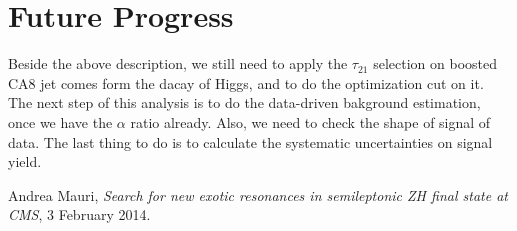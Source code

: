\documentclass[12pt]{article} %
\begin{document}
\section{Future Progress} %

Beside the above description, we still need to apply the $\tau_{21}$ selection on boosted CA8 jet comes form the dacay of Higgs, and to do the optimization cut on it. The next step of this analysis is to do the data-driven bakground estimation, once we have the $\alpha$ ratio already. Also, we need to check the shape of signal of data. The last thing to do is to calculate the systematic uncertainties on signal yield.



\begin{thebibliography}{9} %

 Andrea Mauri, \emph{Search for new exotic resonances in semileptonic ZH final state at CMS}, 3 February 2014.

\end{thebibliography}

\end{document}
